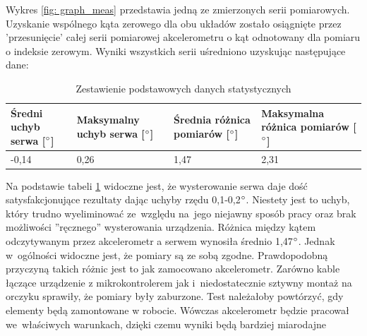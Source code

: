 Wykres \ref{fig: graph_meas} przedstawia jedną ze zmierzonych serii pomiarowych. Uzyskanie wspólnego kąta zerowego dla obu układów zostało osiągnięte przez 'przesunięcie' całej serii pomiarowej akcelerometru o kąt odnotowany dla pomiaru o indeksie zerowym. Wyniki wszystkich serii uśredniono uzyskując następujące dane:

\begin{table}[!ht]
    \centering
    \begin{tabular}{p{3.5cm} | p{3.5cm} | p{3.5cm} | p{3.5cm}}
         Średni uchyb serwa [$\degree$] & Maksymalny uchyb serwa [$\degree$] & Średnia różnica pomiarów [$\degree$] & Maksymalna różnica pomiarów [$\degree$] \\ \hline \hline
         -0,14 & 0,26 & 1,47 & 2,31 \\ 
    \end{tabular}
    \caption{Zestawienie podstawowych danych statystycznych}
    \label{tab: results}
\end{table} 

Na podstawie tabeli \ref{tab: results} widoczne jest, że wysterowanie serwa daje dość satysfakcjonujące rezultaty dając uchyby rzędu 0,1-0,2$\degree$. Niestety jest to uchyb, który trudno wyeliminować ze~względu na~jego niejawny sposób pracy oraz brak możliwości ''ręcznego'' wysterowania urządzenia. Różnica między kątem odczytywanym przez akcelerometr a serwem wynosiła średnio 1,47$\degree$. Jednak w~ogólności widoczne jest, że pomiary są ze sobą zgodne. Prawdopodobną przyczyną takich różnic jest to jak zamocowano akcelerometr. Zarówno kable łączące urządzenie z mikrokontrolerem jak i~niedostatecznie sztywny montaż na orczyku sprawiły, że pomiary były zaburzone. Test należałoby powtórzyć, gdy elementy będą zamontowane w robocie. Wówczas akcelerometr będzie pracował we~właściwych warunkach, dzięki czemu wyniki będą bardziej miarodajne



